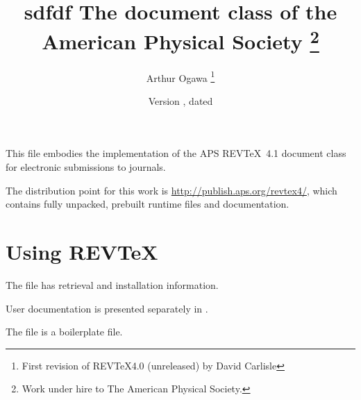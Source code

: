 \title{sdfdf
 The  document class of the American Physical Society%
 \protect\thanks{Work under hire to The American Physical Society.}%
}%
\author{Arthur Ogawa%
 \protect\thanks{First revision of REV\TeX4.0 (unreleased) by David Carlisle}%
}%
\date{Version \fileversion, dated \filedate}%
\newcommand\revtex{REV\TeX}

\maketitle

This file embodies the implementation of the APS \revtex\ 4.1 document class
for electronic submissions to journals.

The distribution point for this work is
\url{http://publish.aps.org/revtex4/},
which contains fully unpacked, prebuilt runtime files and documentation.

\tableofcontents

\section{Using \protect\revtex}

The file  has retrieval and installation information.

User documentation is presented separately in .

The file  is a boilerplate file.

